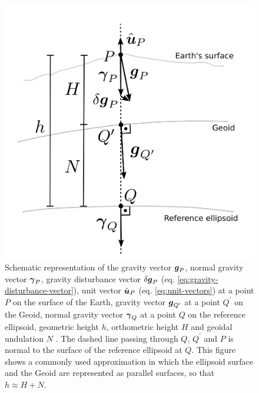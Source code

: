 \documentclass[extra]{gji}
\begin{document}
\begin{figure}
    \includegraphics{figures/surfaces.png}
    \caption{Schematic representation of the gravity vector
        $\mitbf{g}_{P}$, normal gravity vector $\mitbf{\gamma}_{P}$,
        gravity disturbance vector $\delta \mitbf{g}_{P}$
        (eq. \ref{eq:gravity-disturbance-vector}), unit vector 
        $\hat{\mitbf{u}}_{P}$ (eq. \ref{eq:unit-vectors}) at a point $P$ 
        on the surface of the Earth, gravity vector $\mitbf{g}_{Q^{\prime}}$ 
        at a point $Q^{\prime}$ on the Geoid, normal gravity vector 
        $\mitbf{\gamma}_{Q}$ at a point $Q$ on the reference ellipsoid,
        geometric height $h$, orthometric height $H$ and geoidal undulation 
        $N$ \citep{heiskanen-moritz1967}.
        The dashed line passing through
        $Q$, $Q^{\prime}$ and $P$ is normal to the 
        surface of the reference ellipsoid at $Q$. This figure
        shows a commonly used approximation in which the ellipsoid 
        surface and the Geoid are represented as parallel surfaces, 
        so that $h \approx H + N$.}
  \label{fig:surfaces}
\end{figure}

\label{lastpage}
\end{document}
